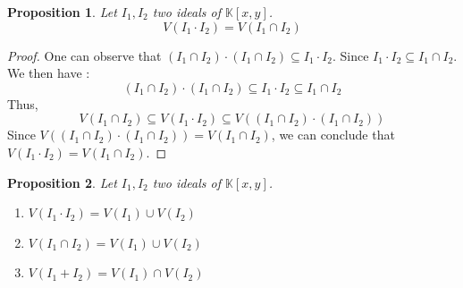 \documentclass{article}
\newtheorem{proposition}{Proposition}[section]
\begin{document}
\begin{proposition}
    Let $I_{1}, I_{2}$ two ideals of $\mathbb{K}[x, y]$. 
    \begin{displaymath}
        V(I_{1} \cdot I_{2}) = V(I_{1} \cap I_{2})
    \end{displaymath}
\end{proposition}

\begin{proof}
    One can observe that $(I_{1} \cap I_{2}) \cdot (I_{1} \cap I_{2}) \subseteq I_{1} \cdot I_{2}$. Since $I_{1} \cdot I_{2} \subseteq I_{1} \cap I_{2}$. We then have : 
    \begin{displaymath}
        (I_{1} \cap I_{2}) \cdot (I_{1} \cap I_{2}) \subseteq I_{1} \cdot I_{2} \subseteq I_{1} \cap I_{2}
    \end{displaymath}
    Thus, 
    \begin{displaymath}
        V(I_{1} \cap I_{2}) \subseteq V(I_{1} \cdot I_{2}) \subseteq V((I_{1} \cap I_{2}) \cdot (I_{1} \cap I_{2}))
    \end{displaymath}
    Since $V((I_{1} \cap I_{2}) \cdot (I_{1} \cap I_{2})) = V(I_{1} \cap I_{2})$, we can conclude that $V(I_{1} \cdot I_{2}) = V(I_{1} \cap I_{2})$.
\end{proof}

\begin{proposition}
    Let $I_{1}, I_{2}$ two ideals of $\mathbb{K}[x, y]$. 
    \begin{enumerate}
        \item[(i)] $V(I_{1} \cdot I_{2}) = V(I_{1}) \cup V(I_{2})$
        \item[(ii)] $V(I_{1} \cap I_{2}) = V(I_{1}) \cup V(I_{2})$
        \item[(iii)] $V(I_{1} + I_{2}) = V(I_{1}) \cap V(I_{2})$
    \end{enumerate}
\end{proposition}
    
\end{document}
